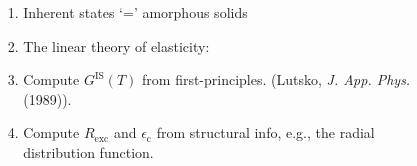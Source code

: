\begin{frame}[c]
\begin{columns}[T]
\begin{column}[T]{0.4\textwidth}
\begin{figure}[t]
\begin{overprint}

    
\end{overprint}
\end{figure}

\end{column}

\begin{column}[T]{0.6\textwidth}

\begin{enumerate}
\item<2-> Inherent states `=' amorphous solids %

\item<13-> The linear theory of elasticity: %

\item<14-> Compute $G^\mathrm{IS}(T)$ from first-principles. (Lutsko, \textit{J. App. Phys.} (1989)).
\item<15-> Compute  $R_\mathrm{exc}$ and $\epsilon_\mathrm{c}$ from structural info, e.g., the radial distribution function. %
\end{enumerate}

\end{column}
\end{columns}

\end{frame}

